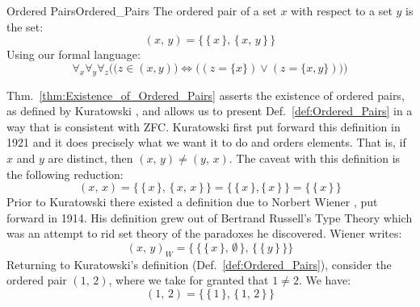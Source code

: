         \begin{fdefinition}{Ordered Pairs}{Ordered_Pairs}
            The \gls{ordered pair} of a \gls{set} $x$ with respect to a set
            $y$ is the set:
            \begin{equation*}
                (x,\,y)=\big\{\,\{\,x\,\},\,\{\,x,\,y\,\}\,\big\}
            \end{equation*}
            Using our formal language:
            \begin{equation*}
                \forall_{x}\forall_{y}\forall_{z}\Big(
                    \big(z\in(x,y)\big)\Longleftrightarrow
                    \big((z=\{x\})\lor(z=\{x,y\})\big)
                \Big)
            \end{equation*}
        \end{fdefinition}
        Thm.~\ref{thm:Existence_of_Ordered_Pairs} asserts the existence of
        ordered pairs, as defined by Kuratowski%
        , and allows us to present
        Def.~\ref{def:Ordered_Pairs} in a way that is consistent with ZFC.
        Kuratowski first put forward this definition in 1921 and it does
        precisely what we want it to do and orders elements. That is, if $x$ and
        $y$ are distinct, then $(x,\,y)\ne(y,\,x)$. The caveat with this
        definition is the following reduction:
        \begin{equation}
            (x,\,x)
            =\big\{\,\{\,x\,\},\,\{\,x,\,x\,\}\,\big\}
            =\big\{\,\{\,x\,\},\{\,x\,\}\,\big\}
            =\big\{\,\{\,x\,\}\,\big\}
        \end{equation}
        Prior to Kuratowski there existed a definition due to Norbert Wiener%
        , put forward in 1914. His definition grew out of
        Bertrand Russell's Type
        Theory which was an attempt to rid set theory of the
        paradoxes he discovered. Wiener writes:
        \begin{equation}
            (x,\,y)_{W}=\Big\{\,\big\{\,\{\,x\,\},\,\emptyset\,\big\},\,
                                \big\{\,\{\,y\,\}\,\big\}\Big\}
        \end{equation}
        Returning to Kuratowski's definition (Def.~\ref{def:Ordered_Pairs}),
        consider the ordered pair $(1,\,2)$, where we take for granted that
        $1\ne{2}$. We have:
        \begin{equation}
            (1,\,2)=\big\{\,\{\,1\,\},\,\{\,1,\,2\,\}\,\big\}
        \end{equation}
